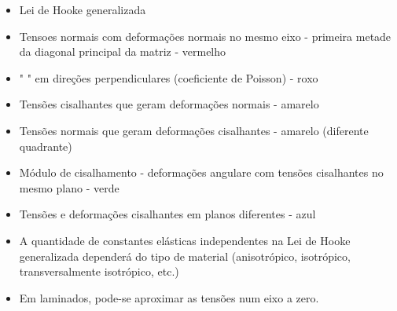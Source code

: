 
\begin{multicols*}{2}

  \begin{itemize}
    \item Lei de Hooke generalizada
    \item Tensoes normais com deformações normais no mesmo eixo - primeira metade da diagonal principal da matriz - vermelho
    \item "           " em direções perpendiculares (coeficiente de Poisson) - roxo 
    \item Tensões cisalhantes que geram deformações normais - amarelo
    \item Tensões normais que geram deformações cisalhantes - amarelo (diferente quadrante) 
    \item Módulo de cisalhamento - deformações angulare com tensões cisalhantes no mesmo plano - verde
    \item Tensões e deformações cisalhantes em planos diferentes - azul
    \item A quantidade de constantes elásticas independentes na Lei de Hooke generalizada dependerá do tipo de material (anisotrópico, isotrópico, transversalmente isotrópico, etc.)
    \item Em laminados, pode-se aproximar as tensões num eixo a zero.
  \end{itemize}

\end{multicols*}
